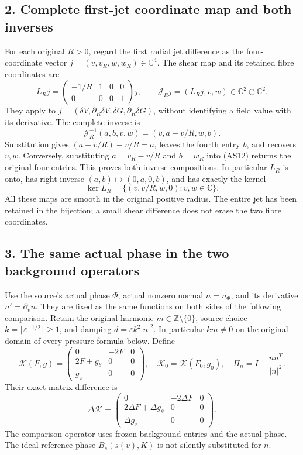 \documentclass[10pt,a4paper]{article}
\begin{document}
\subsection{2. Complete first-jet coordinate map and both inverses}\label{gclosure:complete-first-jet-coordinate-map-and-both-inverses}

For each original \(R>0\), regard the first radial jet difference as the four-coordinate vector \(j=(v,v_R,w,w_R)\in\mathbb C^4\). The shear map and its retained fibre coordinates are \[
L_Rj=\begin{pmatrix}-1/R&1&0&0\\0&0&0&1\end{pmatrix}j,
\qquad
\mathcal J_Rj=(L_Rj,v,w)\in\mathbb C^2\oplus\mathbb C^2.
\tag{AS11}
\] They apply to \(j=(\delta V,\partial_R\delta V,\delta G,\partial_R\delta G)\), without identifying a field value with its derivative. The complete inverse is \[
\mathcal J_R^{-1}(a,b,v,w)=(v,a+v/R,w,b).
\tag{AS12}
\] Substitution gives \((a+v/R)-v/R=a\), leaves the fourth entry \(b\), and recovers \(v,w\). Conversely, substituting \(a=v_R-v/R\) and \(b=w_R\) into (AS12) returns the original four entries. This proves both inverse compositions. In particular \(L_R\) is onto, has right inverse \((a,b)\mapsto(0,a,0,b)\), and has exactly the kernel \[
\ker L_R=\{(v,v/R,w,0):v,w\in\mathbb C\}.
\tag{AS13}
\] All these maps are smooth in the original positive radius. The entire jet has been retained in the bijection; a small shear difference does not erase the two fibre coordinates.

\subsection{3. The same actual phase in the two background operators}\label{gclosure:the-same-actual-phase-in-the-two-background-operators}

Use the source's actual phase \(\Phi\), actual nonzero normal \(n=n_\Phi\), and its derivative \(n'=\partial_vn\). They are fixed as the same functions on both sides of the following comparison. Retain the original harmonic \(m\in\mathbb Z\setminus\{0\}\), source choice \(k=\lceil\varepsilon^{-1/2}\rceil\ge1\), and damping \(d=\varepsilon k^2|n|^2\). In particular \(km\ne0\) on the original domain of every pressure formula below. Define \[
\mathcal K(F,g)=
\begin{pmatrix}0&-2F&0\\2F+g_\theta&0&0\\g_z&0&0\end{pmatrix},
\quad \mathcal K_0=\mathcal K(F_0,g_0),
\quad \Pi_n=I-\frac{nn^T}{|n|^2}.
\tag{AS14}
\] Their exact matrix difference is \[
\Delta\mathcal K=
\begin{pmatrix}0&-2\Delta F&0\\2\Delta F+\Delta g_\theta&0&0\\\Delta g_z&0&0\end{pmatrix}.
\tag{AS15}
\] The comparison operator uses frozen background entries and the actual phase. The ideal reference phase \(B_s(s(v),K)\) is not silently substituted for \(n\).
\end{document}

